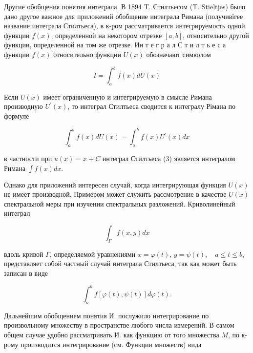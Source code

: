 \documentclass[10pt]{article}
\begin{document}
Другие обобщения понятия интеграла. В 1894 T. Стилтьесом (T. Stieltjes) было дано другое важное для приложений обобщение интеграла Римана (получивігее название интеграла Стилтьеса), в к-ром рассматривается интегрируемость одной функции $f(x)$, определенной на некотором отрезке $[a, b]$, относительно другой функции, определенной на том же отрезке. Ин т е г р а л С т и л т ь е с а функции $f(x)$ относительно функции $U(x)$ обозначают символом



\[

I=\int_{a}^{b} f(x) d U(x)

\]



Если $U(x)$ имеет ограниченную и интегрируемую в смысле Римана производную $U^{\prime}(x)$, то интеграл Стилтьеса сводится к интегралу Рімана по формуле



\[

\int_{a}^{b} f(x) d U(x)=\int_{a}^{b} f(x) U^{\prime}(x) d x

\]



в частности при $u(x)=x+C$ интеграл Стилтьеса (3) является интегралом Римана $\int f(x) d x$.



Однако для приложений интересен случай, когда интегрирующая функция $U(x)$ не имеет производной. Примером может служить рассмотрение в качестве $U(x)$ спектральной меры при изучении спектральных разложений. Криволинейный интеграл



\[

\int_{\Gamma} f(x, y) d x

\]



вдоль кривой $\Gamma$, определяемой уравнениями $x=\varphi(t)$, $y=\psi(t), \quad a \leqslant t \leqslant b$, представляет собой частный случай интеграла Стилтьеса, так как может быть записан в виде



\[

\int_{a}^{b} f[\varphi(t), \psi(t)] d \varphi(t) .

\]



Дальнейшим обобщением понятия И. послужило интегрирование по произвольному множеству в пространстве любого числа измерений. В самом общем случае удобно рассматривать И. как функцию от того множества $M$, по к-рому производится интегрирование (см. Функции множеств) вида
\end{document}
